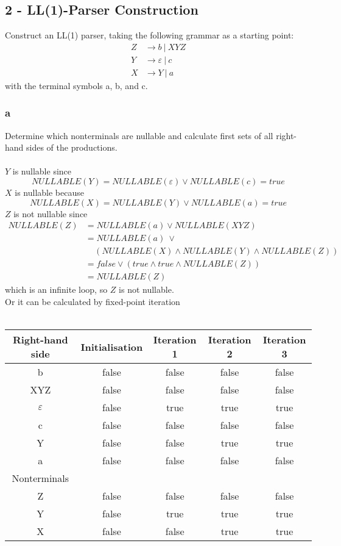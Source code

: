 \documentclass[12pt]{article}
\begin{document}
\newpage

\subsection*{2 - LL(1)-Parser Construction}
Construct an LL(1) parser, taking the following grammar as a starting point:
\begin{align*}
Z &\rightarrow b\:|\:X Y Z \\
Y &\rightarrow \varepsilon\:|\: c \\
X &\rightarrow Y\:|\: a
\end{align*}
with the terminal symbols a, b, and c.
\subsubsection*{a}
Determine which nonterminals are nullable and calculate first sets of all right-hand sides of the productions.\\
\\
$Y$ is nullable since 
$$NULLABLE(Y)=NULLABLE(\varepsilon) \vee NULLABLE(c) =true$$
$X$ is nullable because 
$$NULLABLE(X)=NULLABLE(Y) \vee NULLABLE(a) =true$$
$Z$ is not nullable since
\begin{align*}
NULLABLE(Z)&=NULLABLE(a) \vee NULLABLE(XYZ) \\
&=NULLABLE(a)\:\vee \\
&\:\:\:\:\:(NULLABLE(X) \wedge NULLABLE(Y) \wedge NULLABLE(Z))\\
&=false \vee (true \wedge true \wedge NULLABLE(Z)) \\
&=NULLABLE(Z)
\end{align*}
which is an infinite loop, so $Z$ is not nullable.\\
\newpage
Or it can be calculated by fixed-point iteration\\
\\
\begin{tabular}{c|c|c|c|c}
\hline 
Right-hand side & Initialisation & Iteration 1 & Iteration 2 & Iteration 3 \\ 
\hline 
b & false & false & false & false \\ 
XYZ & false & false & false & false \\ 
$\varepsilon$ & false & true & true & true \\ 
c & false & false & false & false \\  
Y & false & false & true & true \\ 
a & false & false & false & false \\ 
\hline 
Nonterminals &  &  &  &  \\ 
\hline
Z & false & false & false & false \\ 
Y & false & true & true & true \\  
X & false & false & true & true \\ 
\hline 
\end{tabular}\\
\end{document}
